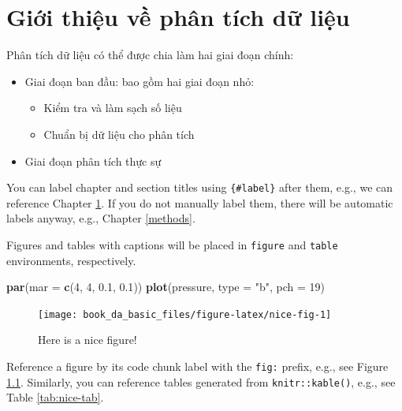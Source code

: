 \documentclass[]{tufte-book}
\newenvironment{Shaded}{}{}
\newcommand{\DataTypeTok}[1]{\textcolor[rgb]{0.56,0.13,0.00}{#1}}
\newcommand{\DecValTok}[1]{\textcolor[rgb]{0.25,0.63,0.44}{#1}}
\newcommand{\FloatTok}[1]{\textcolor[rgb]{0.25,0.63,0.44}{#1}}
\newcommand{\KeywordTok}[1]{\textcolor[rgb]{0.00,0.44,0.13}{\textbf{#1}}}
\newcommand{\NormalTok}[1]{#1}
\newcommand{\StringTok}[1]{\textcolor[rgb]{0.25,0.44,0.63}{#1}}
\providecommand{\tightlist}{%
  \setlength{\itemsep}{0pt}\setlength{\parskip}{0pt}}
\begin{document}
\hypertarget{intro}{%
\chapter{Giới thiệu về phân tích dữ liệu}\label{intro}}

Phân tích dữ liệu có thể được chia làm hai giai đoạn chính:

\begin{itemize}
\tightlist
\item
  Giai đoạn ban đầu: bao gồm hai giai đoạn nhỏ:

  \begin{itemize}
  \tightlist
  \item
    Kiểm tra và làm sạch số liệu
  \item
    Chuẩn bị dữ liệu cho phân tích
  \end{itemize}
\item
  Giai đoạn phân tích thực sự
\end{itemize}

You can label chapter and section titles using \texttt{\{\#label\}} after them, e.g., we can reference Chapter \ref{intro}. If you do not manually label them, there will be automatic labels anyway, e.g., Chapter \ref{methods}.

Figures and tables with captions will be placed in \texttt{figure} and \texttt{table} environments, respectively.

\begin{Shaded}
\begin{Highlighting}[]
\KeywordTok{par}\NormalTok{(}\DataTypeTok{mar =} \KeywordTok{c}\NormalTok{(}\DecValTok{4}\NormalTok{, }\DecValTok{4}\NormalTok{, }\FloatTok{0.1}\NormalTok{, }\FloatTok{0.1}\NormalTok{))}
\KeywordTok{plot}\NormalTok{(pressure, }\DataTypeTok{type =} \StringTok{"b"}\NormalTok{, }\DataTypeTok{pch =} \DecValTok{19}\NormalTok{)}
\end{Highlighting}
\end{Shaded}

\begin{figure}

{\centering \texttt{[image: book\_da\_basic\_files/figure-latex/nice-fig-1]} 

}

\caption[Here is a nice figure!]{Here is a nice figure!}\label{fig:nice-fig}
\end{figure}

Reference a figure by its code chunk label with the \texttt{fig:} prefix, e.g., see Figure \ref{fig:nice-fig}. Similarly, you can reference tables generated from \texttt{knitr::kable()}, e.g., see Table \ref{tab:nice-tab}.
\end{document}
